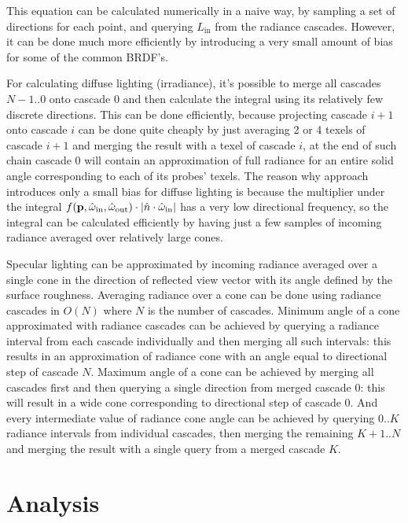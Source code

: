 \documentclass{jcgt}
\begin{document}
This equation can be calculated numerically in a naive way, by sampling a set of directions for each point, and querying $L_{\mathrm{in}}$ from the radiance cascades. However, it can be done much more efficiently by introducing a very small amount of bias for some of the common BRDF's.

For calculating diffuse lighting (irradiance), it's possible to merge all cascades $N-1..0$ onto cascade 0 and then calculate the integral using its relatively few discrete directions. This can be done efficiently, because projecting cascade $i+1$ onto cascade $i$ can be done quite cheaply by just averaging 2 or 4 texels of cascade $i+1$ and merging the result with a texel of cascade $i$, at the end of such chain cascade 0 will contain an approximation of full radiance for an entire solid angle corresponding to each of its probes' texels. The reason why approach introduces only a small bias for diffuse lighting is because the multiplier under the integral $ f(\textbf p, \hat \omega_\mathrm{in}, \hat{\omega}_\mathrm{out}) \cdot |\hat{n} \cdot \hat{\omega}_\mathrm{in} |$ has a very low directional frequency, so the integral can be calculated efficiently by having just a few samples of incoming radiance averaged over relatively large cones.

Specular lighting can be approximated by incoming radiance averaged over a single cone in the direction of reflected view vector with its angle defined by the surface roughness. Averaging radiance over a cone can be done using radiance cascades in $O(N)$ where $N$ is the number of cascades. Minimum angle of a cone approximated with radiance cascades can be achieved by querying a radiance interval from each cascade individually and then merging all such intervals: this results in an approximation of radiance cone with an angle equal to directional step of cascade $N$.  Maximum angle of a cone can be achieved by merging all cascades first and then querying a single direction from merged cascade 0: this will result in a wide cone corresponding to directional step of cascade 0. And every intermediate value of radiance cone angle can be achieved by querying $0..K$ radiance intervals from individual cascades, then merging the remaining $K+1..N$ and merging the result with a single query from a merged cascade $K$.

\section{Analysis}
\end{document}
